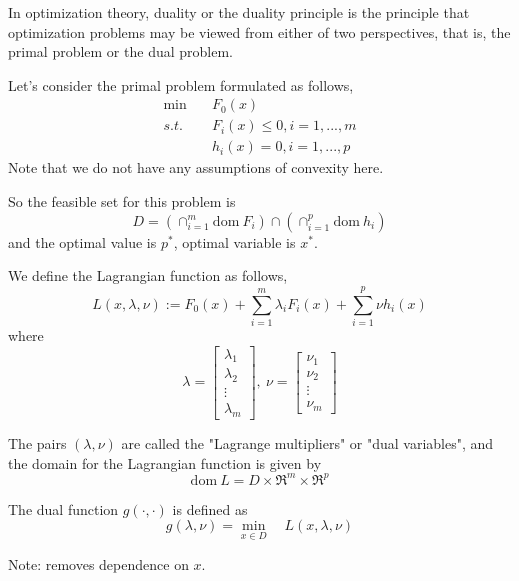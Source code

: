 
In optimization theory, duality or the duality principle is the principle that optimization problems may be viewed from either of two perspectives, that is, the primal problem or the dual problem.

Let's consider the primal problem formulated as follows,
\begin{align*}
\min \quad&F_0(x) \\
s.t. \quad&F_i(x)\leq 0, i = 1,...,m\\
&h_i(x)= 0, i = 1,...,p
\end{align*}
Note that we do not have any assumptions of convexity here.

So the feasible set for this problem is
$$D = (\cap^m_{i=1}\text{dom}\ F_i)\cap(\cap^p_{i=1}\text{dom}\ h_i)$$ 
and the optimal value is $p^*$, optimal variable is $x^*$.

\begin{definition}
	We define the Lagrangian function as follows,
	$$L(x,\lambda,\nu) := F_0(x) + \sum^m_{i=1}\lambda_i F_i(x) + \sum^p_{i=1}\nu h_i(x)$$
	where
	$$\lambda =
	\begin{bmatrix}
		\lambda_1\\
		\lambda_2\\
		\vdots\\
		\lambda_m
	\end{bmatrix},\
	\nu = 
	\begin{bmatrix}
		\nu_1\\
		\nu_2\\
		\vdots\\
		\nu_m
	\end{bmatrix}$$

The pairs $(\lambda, \nu)$ are called the "Lagrange multipliers" or "dual variables", and the domain for the Lagrangian function is given by 
$$\text{dom}\ L = D\times \Re^m \times \Re^p$$
\end{definition}

\begin{definition}
	The dual function $g(\cdot, \cdot)$ is defined as 
	\begin{equation*}
	g(\lambda, \nu) = \min_{x\in D}\quad L(x,\lambda,\nu)
	\end{equation*}
	
	Note: removes dependence on $x$.
\end{definition}


